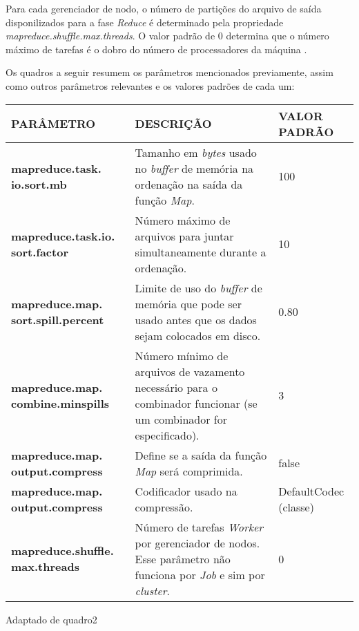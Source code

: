 Para cada gerenciador de nodo, o número de partições do arquivo de saída disponilizados para a fase \textit{Reduce} é determinado pela propriedade \textit{mapreduce.shuffle.max.threads}. O valor padrão de 0 determina que o número máximo de tarefas é o dobro do número de processadores da máquina \cite{ProHadoop09}.

Os quadros a seguir resumem os parâmetros mencionados previamente, assim como outros parâmetros relevantes e os valores padrões de cada um:

{\footnotesize
  \centering
  \begin{tabular}{|p{30mm}|p{50mm}|p{35mm}|}\hline
    \textbf{PARÂMETRO}                         & \textbf{DESCRIÇÃO}                                                                                                                   & \textbf{VALOR PADRÃO} \\\hline
    \textbf{mapreduce.task. io.sort.mb}        & Tamanho em \textit{bytes} usado no \textit{buffer} de memória na ordenação na saída da função \textit{Map}.                          & 100                   \\\hline
    \textbf{mapreduce.task.io. sort.factor}    & Número máximo de arquivos para juntar simultaneamente durante a ordenação.                                                           & 10                    \\\hline
    \textbf{mapreduce.map. sort.spill.percent} & Limite de uso do \textit{buffer} de memória que pode ser usado antes que os dados sejam colocados em disco.                          & 0.80                  \\\hline
    \textbf{mapreduce.map. combine.minspills}  & Número mínimo de arquivos de vazamento necessário para o combinador funcionar (se um combinador for especificado).                   & 3                     \\\hline
    \textbf{mapreduce.map. output.compress}    & Define se a saída da função \textit{Map} será comprimida.                                                                            & false                 \\\hline
    \textbf{mapreduce.map. output.compress}    & Codificador usado na compressão.                                                                                                     & DefaultCodec (classe) \\\hline
    \textbf{mapreduce.shuffle. max.threads}    & Número de tarefas \textit{Worker} por gerenciador de nodos. Esse parâmetro não funciona por \textit{Job} e sim por \textit{cluster}. & 0                     \\\hline
  \end{tabular}}
{Adaptado de \cite{HadoopBook15}}{quadro2}{}{}

